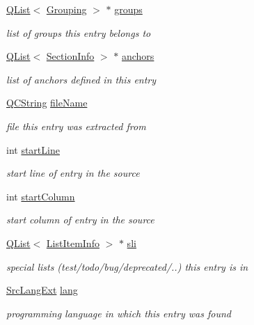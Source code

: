 \begin{DoxyCompactItemize}
\hyperlink{class_q_list}{Q\+List}$<$ \hyperlink{struct_grouping}{Grouping} $>$ $\ast$ \hyperlink{class_entry_af10b19c474b2a7173a79b97124d25fc3}{groups}
\begin{DoxyCompactList}\small\item\em list of groups this entry belongs to \end{DoxyCompactList}\item 
\hyperlink{class_q_list}{Q\+List}$<$ \hyperlink{struct_section_info}{Section\+Info} $>$ $\ast$ \hyperlink{class_entry_a4608d738e9d9c7798d8b83a2846b3d12}{anchors}
\begin{DoxyCompactList}\small\item\em list of anchors defined in this entry \end{DoxyCompactList}\item 
\hyperlink{class_q_c_string}{Q\+C\+String} \hyperlink{class_entry_a736f1dfadfe0c0fabb022c533aa27fdc}{file\+Name}
\begin{DoxyCompactList}\small\item\em file this entry was extracted from \end{DoxyCompactList}\item 
int \hyperlink{class_entry_a81bf40c0a6646dc1e33097d7e2552c96}{start\+Line}
\begin{DoxyCompactList}\small\item\em start line of entry in the source \end{DoxyCompactList}\item 
int \hyperlink{class_entry_a59c06b1f3be3c3220404df1d3fdc5bfb}{start\+Column}
\begin{DoxyCompactList}\small\item\em start column of entry in the source \end{DoxyCompactList}\item 
\hyperlink{class_q_list}{Q\+List}$<$ \hyperlink{struct_list_item_info}{List\+Item\+Info} $>$ $\ast$ \hyperlink{class_entry_a5328bd7f1580a30ad2345840044c2a4b}{sli}
\begin{DoxyCompactList}\small\item\em special lists (test/todo/bug/deprecated/..) this entry is in \end{DoxyCompactList}\item 
\hyperlink{types_8h_a9974623ce72fc23df5d64426b9178bf2}{Src\+Lang\+Ext} \hyperlink{class_entry_a4ee5bbd6ac8bdf2f017d93edcefce5e9}{lang}
\begin{DoxyCompactList}\small\item\em programming language in which this entry was found \end{DoxyCompactList}\item 

\end{DoxyCompactItemize}
